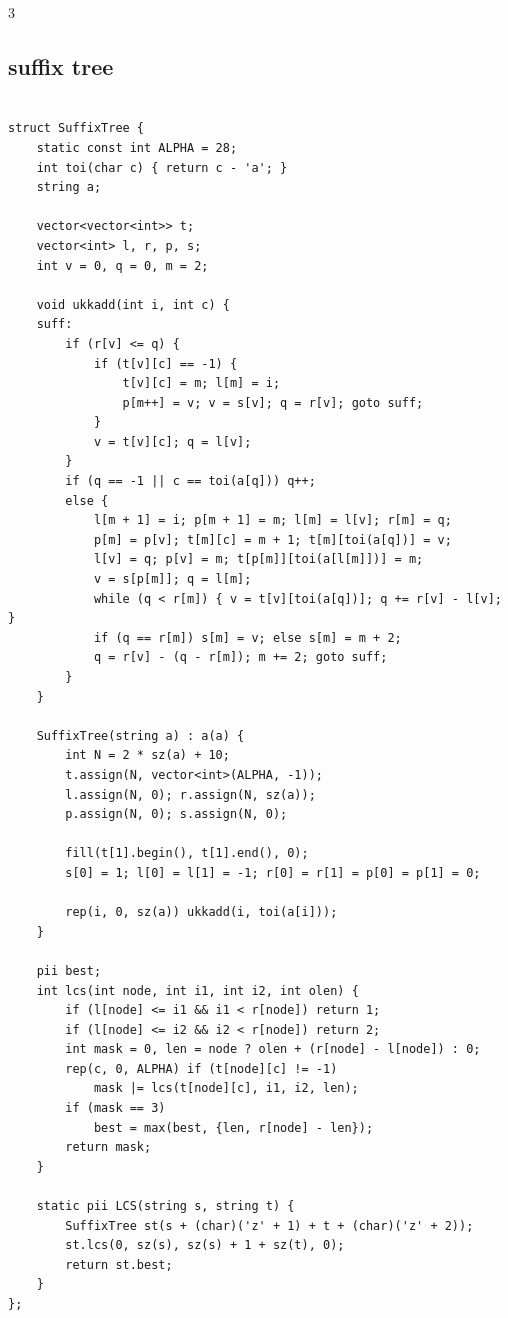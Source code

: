 \documentclass[twoside]{article}
\begin{document}
\begin{multicols*}{3}
{\subsection*{suffix tree}
}
\begin{verbatim}

struct SuffixTree {
    static const int ALPHA = 28;
    int toi(char c) { return c - 'a'; }
    string a;
    
    vector<vector<int>> t;
    vector<int> l, r, p, s;
    int v = 0, q = 0, m = 2;

    void ukkadd(int i, int c) { 
    suff:
        if (r[v] <= q) {
            if (t[v][c] == -1) {
                t[v][c] = m; l[m] = i;
                p[m++] = v; v = s[v]; q = r[v]; goto suff;
            }
            v = t[v][c]; q = l[v];
        }
        if (q == -1 || c == toi(a[q])) q++;
        else {
            l[m + 1] = i; p[m + 1] = m; l[m] = l[v]; r[m] = q;
            p[m] = p[v]; t[m][c] = m + 1; t[m][toi(a[q])] = v;
            l[v] = q; p[v] = m; t[p[m]][toi(a[l[m]])] = m;
            v = s[p[m]]; q = l[m];
            while (q < r[m]) { v = t[v][toi(a[q])]; q += r[v] - l[v]; }
            if (q == r[m]) s[m] = v; else s[m] = m + 2;
            q = r[v] - (q - r[m]); m += 2; goto suff;
        }
    }

    SuffixTree(string a) : a(a) {
        int N = 2 * sz(a) + 10;
        t.assign(N, vector<int>(ALPHA, -1));
        l.assign(N, 0); r.assign(N, sz(a));
        p.assign(N, 0); s.assign(N, 0);

        fill(t[1].begin(), t[1].end(), 0);
        s[0] = 1; l[0] = l[1] = -1; r[0] = r[1] = p[0] = p[1] = 0;

        rep(i, 0, sz(a)) ukkadd(i, toi(a[i]));
    }

    pii best;
    int lcs(int node, int i1, int i2, int olen) {
        if (l[node] <= i1 && i1 < r[node]) return 1;
        if (l[node] <= i2 && i2 < r[node]) return 2;
        int mask = 0, len = node ? olen + (r[node] - l[node]) : 0;
        rep(c, 0, ALPHA) if (t[node][c] != -1)
            mask |= lcs(t[node][c], i1, i2, len);
        if (mask == 3)
            best = max(best, {len, r[node] - len});
        return mask;
    }

    static pii LCS(string s, string t) {
        SuffixTree st(s + (char)('z' + 1) + t + (char)('z' + 2));
        st.lcs(0, sz(s), sz(s) + 1 + sz(t), 0);
        return st.best;
    }
};

\end{verbatim}


\end{multicols*}
\end{document}
